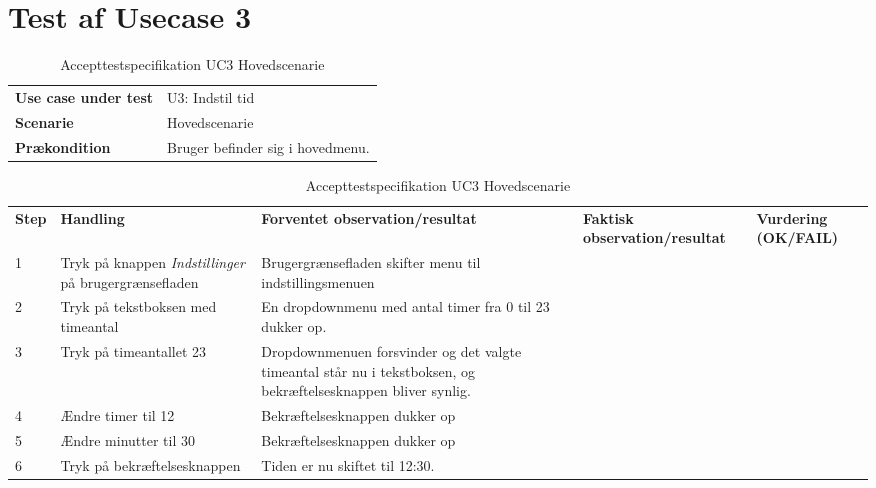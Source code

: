 \section{Test af Usecase 3}
\begin{table}[H]
	\centering
	\caption{Accepttestspecifikation UC3 Hovedscenarie}
	\label{ATUC1:Hovedscenarie}
	\begin{tabular}{ p{80pt}  p{320pt} }\hline
		\rowcolor{white}	
		\textbf{Use case under test} & U3: Indstil tid \\
		\rowcolor{lightgray}
		\textbf{Scenarie} & Hovedscenarie \\\rowcolor{white}	
		\textbf{Prækondition} & Bruger befinder sig i hovedmenu.
 \\
		\hline
	\end{tabular}
	\begin{tabular}{  p{26pt} p{100pt}  p{101pt} | p{67pt} | p{68pt}}
		\textbf{Step} & \textbf{Handling} & \textbf{Forventet observation/resultat} & \textbf{Faktisk observation/resultat} & \textbf{Vurdering (OK/FAIL)}\\
		1 & Tryk på knappen \emph{Indstillinger} på brugergrænsefladen & Brugergrænsefladen skifter menu til indstillingsmenuen &  &  \\
		2 & Tryk på tekstboksen med timeantal & En dropdownmenu med antal timer fra 0 til 23 dukker op.  &  & \\
		3 & Tryk på timeantallet 23 & Dropdownmenuen forsvinder og det valgte timeantal står nu i tekstboksen, og bekræftelsesknappen bliver synlig. &  &  \\
		
		4 & Ændre timer til 12 & Bekræftelsesknappen dukker op &  &  \\
		5 & Ændre minutter til 30 & Bekræftelsesknappen dukker op &  &  \\	
		6 & Tryk på bekræftelsesknappen & Tiden er nu skiftet til 12:30.  &  &  \\
		\hline
	\end{tabular}
\end{table}

